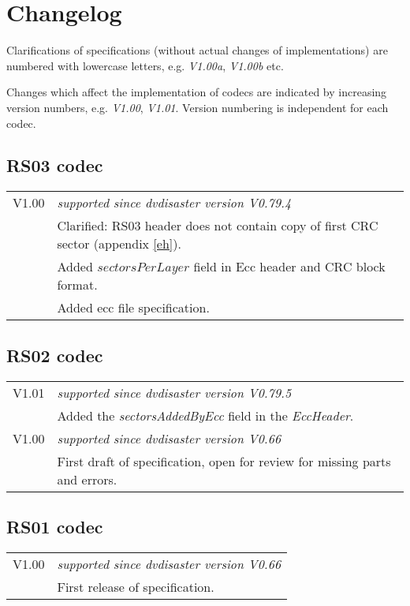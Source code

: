 \section{Changelog}

Clarifications of specifications (without actual changes of implementations) 
are numbered with lowercase letters, e.g. {\em V1.00a}, {\em V1.00b} etc.

\smallskip

Changes which affect the implementation of codecs are indicated by increasing
version numbers, e.g. {\em V1.00}, {\em V1.01}. Version numbering is independent
for each codec.

\subsection{RS03 codec}

\begin{tabular}{lp{14cm}}
V1.00 & {\em supported since dvdisaster version V0.79.4} \\
      & Clarified: RS03 header does not contain copy of first CRC sector (appendix \ref{eh}). \\
      & Added $sectorsPerLayer$ field in Ecc header and CRC block format.\\
      & Added ecc file specification.\\
\end{tabular}

\subsection{RS02 codec}

\begin{tabular}{lp{14cm}}
V1.01 & {\em supported since dvdisaster version V0.79.5} \\
      & Added the {\em sectorsAddedByEcc} field in the {\em EccHeader}. \\
V1.00 & {\em supported since dvdisaster version V0.66} \\
      & First draft of specification, open for review for missing parts and errors. \\
\end{tabular}

\subsection{RS01 codec}

\begin{tabular}{lp{14cm}}
V1.00 & {\em supported since dvdisaster version V0.66} \\
      & First release of specification. \\
\end{tabular}

\newpage
